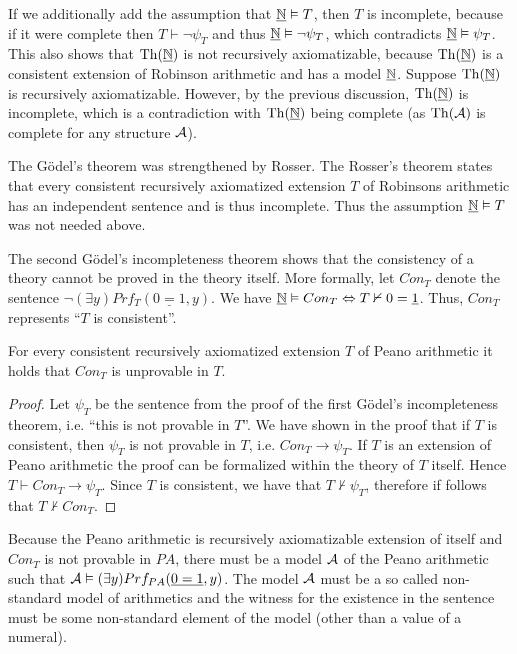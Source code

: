 If we additionally add the assumption that $\underline{\mathbb{N}} \vDash T$, then $T$ is incomplete, because if it were complete then $T \vdash \neg \psi_T$ and thus $\underline{\mathbb{N}} \vDash \neg \psi_T$, which contradicts $\underline{\mathbb{N}} \vDash \psi_T$. This also shows that $\operatorname{Th}(\underline{\mathbb{N}})$ is not recursively axiomatizable, because $\operatorname{Th}(\underline{\mathbb{N}})$ is a consistent extension of Robinson arithmetic and has a model $\underline{\mathbb{N}}$. Suppose $\operatorname{Th}(\underline{\mathbb{N}})$ is recursively axiomatizable. However, by the previous discussion, $\operatorname{Th}(\underline{\mathbb{N}})$ is incomplete, which is a contradiction with $\operatorname{Th}(\underline{\mathbb{N}})$ being complete (as $\operatorname{Th}(\mathcal{A})$ is complete for any structure $\mathcal{A}$).

The Gödel's theorem was strengthened by Rosser. The Rosser's theorem states that every consistent recursively axiomatized extension $T$ of Robinsons arithmetic has an independent sentence and is thus incomplete. Thus the assumption $\underline{\mathbb{N}} \vDash T$ was not needed above.

The second Gödel's incompleteness theorem shows that the consistency of a theory cannot be proved in the theory itself. More formally, let $Con_T$ denote the sentence $\neg (\exists y)Prf_T(\underline{0 = 1}, y)$. We have $\underline{\mathbb{N}} \vDash Con_T \Leftrightarrow T \nvdash 0 = \underline{1}$. Thus, $Con_T$ represents ``$T$ is consistent''.

\begin{theorem}
For every consistent recursively axiomatized extension $T$ of Peano arithmetic it holds that $Con_T$ is unprovable in $T$.
\end{theorem}
\begin{proof}
Let $\psi_T$ be the sentence from the proof of the first Gödel's incompleteness theorem, i.e. ``this is not provable in $T$''. We have shown in the proof that if $T$ is consistent, then $\psi_T$ is not provable in $T$, i.e. $Con_T \to \psi_T$. If $T$ is an extension of Peano arithmetic the proof can be formalized within the theory of $T$ itself. Hence $T\vdash Con_T \to \psi_T$. Since $T$ is consistent, we have that $T\nvdash \psi_T$, therefore if follows that $T \nvdash Con_T$. 
\end{proof}

Because the Peano arithmetic is recursively axiomatizable extension of itself and $Con_T$ is not provable in $PA$, there must be a model $\mathcal{A}$ of the Peano arithmetic such that $\mathcal{A} \vDash (\exists y)Prf_{PA}(\underline{0 = 1}, y)$. The model $\mathcal{A}$ must be a so called non-standard model of arithmetics and the witness for the existence in the sentence must be some non-standard element of the model (other than a value of a numeral).

